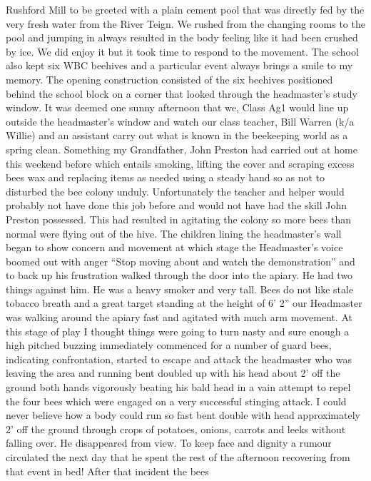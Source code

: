 Rushford Mill to be greeted with a plain cement pool that was directly fed by
the very fresh water from the River Teign.  We rushed from the changing rooms
to the pool and jumping in always resulted in the body feeling like it had been
crushed by ice.  We did enjoy it but it took time to respond to the movement.
The school also kept six WBC beehives and a particular event always brings a
smile to my memory.  The opening construction consisted of the six beehives
positioned behind the school block on a corner that looked through the
headmaster's study window.  It was deemed one sunny afternoon that we, Class
Ag1 would line up outside the headmaster's window and watch our class teacher,
Bill Warren (k/a Willie) and an assistant carry out what is known in the
beekeeping world as a spring clean.  Something my Grandfather, John Preston had
carried out at home this weekend before which entails smoking, lifting the
cover and scraping excess bees wax and replacing items as needed using a steady
hand so as not to disturbed the bee colony unduly.  Unfortunately the teacher
and helper would probably not have done this job before and would not have had
the skill John Preston possessed.  This had resulted in agitating the colony so
more bees than normal were flying out of the hive. The children lining the
headmaster's wall began to show concern and movement at which stage the
Headmaster's voice boomed out with anger ``Stop moving about and watch the
demonstration'' and to back up his frustration walked through the door into the
apiary.  He had two things against him.  He was a heavy smoker and very tall.
Bees do not like stale tobacco breath and a great target standing at the height
of 6' 2'' our Headmaster was walking around the apiary fast and agitated with
much arm movement.  At this stage of play I thought things were going to turn
nasty and sure enough a high pitched buzzing immediately commenced for a number
of guard bees, indicating confrontation, started to escape and attack the
headmaster who was leaving the area and running bent doubled up with his head
about 2' off the ground both hands vigorously beating his bald head in a vain
attempt to repel the four bees which were engaged on a very successful stinging
attack.  I could never believe how a body could run so fast bent double with
head approximately  2' off the ground through crops of potatoes, onions,
carrots and leeks without falling over.  He disappeared from view.  To keep
face and dignity a rumour circulated the next day that he spent the rest of the
afternoon recovering from that event in bed!  After that incident the bees
